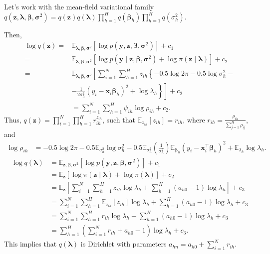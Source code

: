 \begin{enumerate}[leftmargin=*]
Let's work with the mean-field variational family $q(\bm{z},\bm{\lambda},\bm{\beta},\bm{\sigma}^2)=q(\bm{z})q(\bm{\lambda})\prod_{h=1}^H q(\bm{\beta}_h)\prod_{h=1}^H q({\sigma}^2_h)$.

Then,
\begin{align*}
	\log q(\bm{z})=&\mathbb{E}_{\bm{\lambda},\bm{\beta},\bm{\sigma}^2}\left[\log p(\bm{y},\bm{z},\bm{\beta},\bm{\sigma}^2)\right] + c_1\\
	=&\mathbb{E}_{\bm{\lambda},\bm{\beta},\bm{\sigma}^2}\left[\log p(\bm{y}\mid\bm{z},\bm{\beta},\bm{\sigma}^2)+\log \pi(\bm{z}\mid\bm{\lambda})\right] + c_2\\
	=&\mathbb{E}_{\bm{\lambda},\bm{\beta},\bm{\sigma}^2}\left[\sum_{i=1}^N\sum_{h=1}^H z_{ih}\left\{-0.5\log 2\pi - 0.5 \log \sigma^2_h - \right.\right.\\
	&\left.\left.-\frac{1}{2\sigma^2_h}(y_i-\bm{x}_i\bm{\beta}_h)^2 + \log\lambda_h\right\}\right] + c_2\\
	&=\sum_{i=1}^N\sum_{h=1}^H\psi_{ih}\log \rho_{ih} + c_2.
\end{align*}
Thus, $q(\bm{z})=\prod_{i=1}^N\prod_{h=1}^H r_{ih}^{z_{ih}}$, such that $\mathbb{E}_{z_{ih}}[z_{ih}]=r_{ih}$, where $r_{ih}=\frac{\rho_{ih}}{\sum_{j=1}^H\rho_{ij}}$, and
\begin{align*}
	\log \rho_{ih}&=-0.5\log 2\pi -0.5\mathbb{E}_{\sigma^2_h} \log \sigma_h^2 - 0.5 \mathbb{E}_{\sigma^2_h}\left(\frac{1}{\sigma^2_h}\right)\mathbb{E}_{\bm{\beta}_h}(y_i-\bm{x}_i^{\top}\bm{\beta}_h)^2 + \mathbb{E}_{\lambda_h}\log \lambda_h.
\end{align*}
\begin{align*}
	\log q(\bm{\lambda})&=\mathbb{E}_{\bm{z},\bm{\beta},\bm{\sigma}^2}\left[\log p(\bm{y},\bm{z},\bm{\beta},\bm{\sigma}^2)\right]+c_1\\
	&=\mathbb{E}_{\bm{z}}\left[\log \pi(\bm{z}\mid \bm{\lambda})+\log \pi(\bm{\lambda})\right]+c_2\\
	&=\mathbb{E}_{\bm{z}}\left[\sum_{i=1}^N\sum_{h=1}^Hz_{ih}\log \lambda_h+\sum_{h=1}^H(a_{h0}-1)\log \lambda_h\right]+c_3\\
	&=\sum_{i=1}^N\sum_{h=1}^H \mathbb{E}_{z_{ih}}[z_{ih}]\log \lambda_h+\sum_{h=1}^H(a_{h0}-1)\log \lambda_h+c_3\\
	&=\sum_{i=1}^N\sum_{h=1}^H r_{ih}\log \lambda_h+\sum_{h=1}^H(a_{h0}-1)\log \lambda_h+c_3\\
	&=\sum_{h=1}^H \left(\sum_{i=1}^Nr_{ih}+a_{h0}-1\right)\log \lambda_h+c_3.
\end{align*}
This implies that $q(\bm{\lambda})$ is Dirichlet with parameters $a_{hn}=a_{h0}+\sum_{i=1}^N r_{ih}$. 

\end{enumerate}
